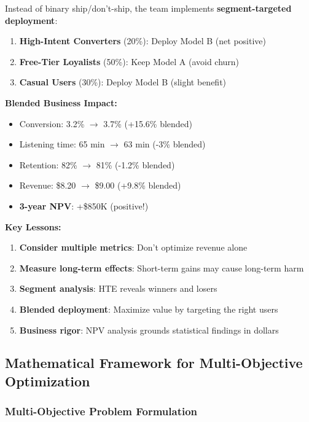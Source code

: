 Instead of binary ship/don't-ship, the team implements \textbf{segment-targeted deployment}:

\begin{enumerate}
    \item \textbf{High-Intent Converters} (20\%): Deploy Model B (net positive)
    \item \textbf{Free-Tier Loyalists} (50\%): Keep Model A (avoid churn)
    \item \textbf{Casual Users} (30\%): Deploy Model B (slight benefit)
\end{enumerate}

\textbf{Blended Business Impact:}
\begin{itemize}
    \item Conversion: 3.2\% $\to$ 3.7\% (+15.6\% blended)
    \item Listening time: 65 min $\to$ 63 min (-3\% blended)
    \item Retention: 82\% $\to$ 81\% (-1.2\% blended)
    \item Revenue: \$8.20 $\to$ \$9.00 (+9.8\% blended)
    \item \textbf{3-year NPV}: +\$850K (positive!)
\end{itemize}

\textbf{Key Lessons:}
\begin{enumerate}
    \item \textbf{Consider multiple metrics}: Don't optimize revenue alone
    \item \textbf{Measure long-term effects}: Short-term gains may cause long-term harm
    \item \textbf{Segment analysis}: HTE reveals winners and losers
    \item \textbf{Blended deployment}: Maximize value by targeting the right users
    \item \textbf{Business rigor}: NPV analysis grounds statistical findings in dollars
\end{enumerate}

\subsection{Mathematical Framework for Multi-Objective Optimization}

\subsubsection{Multi-Objective Problem Formulation}

